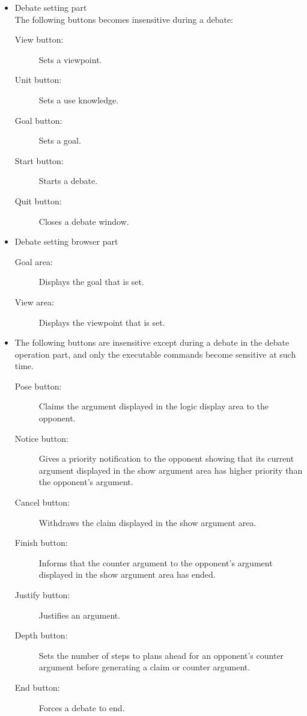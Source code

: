 \begin{itemize}

\item Debate setting part\\
The following buttons becomes insensitive during a debate:
\begin{description}
\item[View button:] Sets a viewpoint. 
\item[Unit button:] Sets a use knowledge. 
\item[Goal button:] Sets a goal. 
\item[Start button:] Starts a debate. 
\item[Quit button:] Closes a debate window. 
\end{description}

\item Debate setting browser part
\begin{description}
\item[Goal area:] Displays the goal that is set. 
\item[View area:] Displays the viewpoint that is set. 
\end{description}

\item The following buttons are insensitive except during a debate in
  the debate operation part, and only the executable commands become sensitive at such time.
\begin{description}
\item[Pose button:] Claims the argument displayed in the logic display area to the opponent. 
\item[Notice button:] Gives a priority notification to the opponent showing that its current argument displayed in the show argument area has higher priority than the opponent's argument.
\item[Cancel button:] Withdraws the claim displayed in the show argument area.
\item[Finish button:] Informs that the counter argument to the opponent's argument displayed in the show argument area has ended.
\item[Justify button:] Justifies an argument.
\item[Depth button:] Sets the number of steps to plans ahead for an opponent's counter argument before generating a claim or counter argument.
\item[End button:] Forces a debate to end.
\end{description}


\end{itemize}
